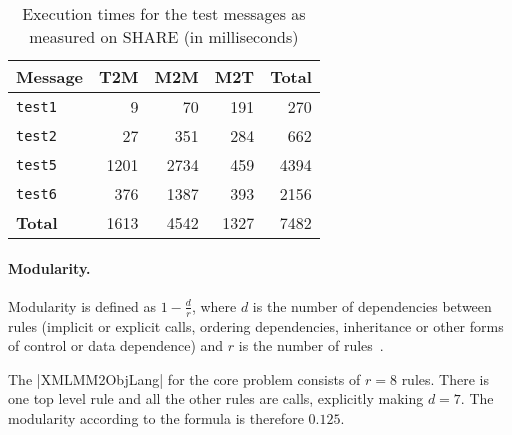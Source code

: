 \begin{table}[h!t]
  \centering
  \begin{tabular}{| l | r | r | r | r |}
    \hline
    \textbf{Message} & \textbf{T2M} & \textbf{M2M} & \textbf{M2T} & \textbf{Total} \\
    \hline
    \texttt{test1}   & 9      & 70     & 191   & 270  \\
    \texttt{test2}   & 27     & 351    & 284   & 662  \\
    \texttt{test5}   & 1201   & 2734   & 459   & 4394 \\
    \texttt{test6}   & 376    & 1387   & 393   & 2156 \\
    \hline
    \textbf{Total}   & 1613   & 4542   & 1327  & 7482 \\
    \hline
  \end{tabular}
  \caption{Execution times for the test \FIXML messages as measured on SHARE (in milliseconds)}
  \label{tab:ExecutionTime}
\end{table}


\paragraph{Modularity.}
%
Modularity is defined as $1 - \frac{d}{r}$, where $d$ is the number of dependencies between rules (implicit or explicit calls, ordering dependencies, inheritance or other forms of control or data dependence) and $r$ is the number of rules~\cite{Lano2014}.

The \Scala|XMLMM2ObjLang| for the core problem consists of $r=8$ rules.
There is one top level rule and all the other rules are calls, explicitly making $d=7$.
The modularity according to the formula is therefore $0.125$.